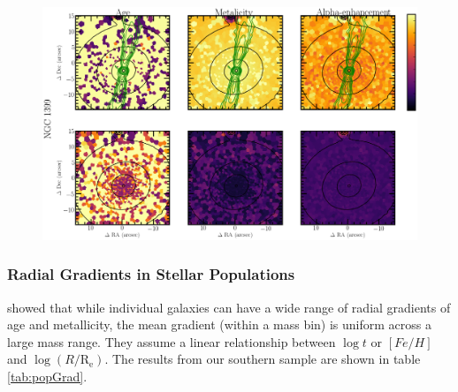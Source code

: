 		\begin{figure}
			\centering
			\includegraphics[height=0.31\textheight]{chapter4/muse/pop2.png}
		\end{figure}



		\subsubsection{Radial Gradients in Stellar Populations}
			\label{subsubsec:popGrad}

			\citet{Koleva2011} showed that while individual galaxies can have a wide range of radial gradients of age and metallicity, the mean gradient (within a mass bin) is uniform across a large mass range. They assume a linear relationship between $\log t$ or $[Fe/H]$ and $\log (R/\mathrm{R_e})$. The results from our southern sample are shown in table \ref{tab:popGrad}. 

